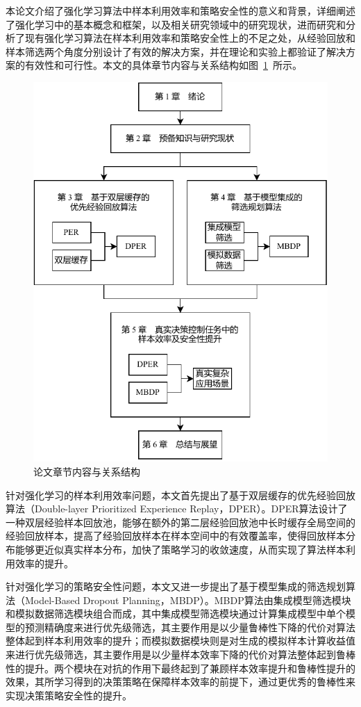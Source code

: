 本论文介绍了强化学习算法中样本利用效率和策略安全性的意义和背景，详细阐述了强化学习中的基本概念和框架，以及相关研究领域中的研究现状，进而研究和分析了现有强化学习算法在样本利用效率和策略安全性上的不足之处，从经验回放和样本筛选两个角度分别设计了有效的解决方案，并在理论和实验上都验证了解决方案的有效性和可行性。本文的具体章节内容与关系结构如图~\ref{fig:paper-struc}~所示。

\begin{figure}[ht]
  \centering
  \includegraphics[width=0.80\linewidth]{figures/paper-struc.pdf}
  \caption{论文章节内容与关系结构}
  \label{fig:paper-struc}
\end{figure}

针对强化学习的样本利用效率问题，本文首先提出了基于双层缓存的优先经验回放算法（Double-layer Prioritized Experience Replay，DPER）。DPER算法设计了一种双层经验样本回放池，能够在额外的第二层经验回放池中长时缓存全局空间的经验回放样本，提高了经验回放样本在样本空间中的有效覆盖率，使得回放样本分布能够更近似真实样本分布，加快了策略学习的收敛速度，从而实现了算法样本利用效率的提升。

针对强化学习的策略安全性问题，本文又进一步提出了基于模型集成的筛选规划算法（Model-Based Dropout Planning，MBDP）。MBDP算法由集成模型筛选模块和模拟数据筛选模块组合而成，其中集成模型筛选模块通过计算集成模型中单个模型的预测精确度来进行优先级筛选，其主要作用是以少量鲁棒性下降的代价对算法整体起到样本利用效率的提升；而模拟数据模块则是对生成的模拟样本计算收益值来进行优先级筛选，其主要作用是以少量样本效率下降的代价对算法整体起到鲁棒性的提升。两个模块在对抗的作用下最终起到了兼顾样本效率提升和鲁棒性提升的效果，其所学习得到的决策策略在保障样本效率的前提下，通过更优秀的鲁棒性来实现决策策略安全性的提升。

